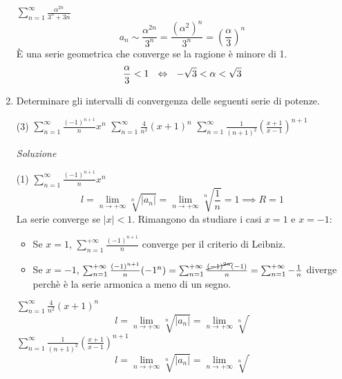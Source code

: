 \documentclass{article}
\begin{document}
\begin{enumerate}[label=\textbf{Esercizio 9.\arabic*.},itemindent=*]
\begin{tasks}
        \task $\sum_{n=1}^\infty\frac{\alpha^{2n}}{3^n+3n}$\\
        \[a_n\sim\frac{\alpha^{2n}}{3^n}=\frac{(\alpha^2)^n}{3^n}=\left( \frac{\alpha}{3} \right)^n\]
        È una serie geometrica che converge se la ragione è minore di 1. 
        \[\frac{\alpha}{3}<1 ~~\Leftrightarrow~~-\sqrt{3}<\alpha<\sqrt{3} \]
    \end{tasks}
    \item Determinare gli intervalli di convergenza delle seguenti serie di potenze.
    \begin{tasks}(3)
        \task $\sum_{n=1}^\infty\frac{(-1)^{n+1}}{n}x^n$
        \task $\sum_{n=1}^\infty\frac{4}{n^2}(x+1)^n$
        \task $\sum_{n=1}^\infty\frac{1}{(n+1)^2}\left( \frac{x+1}{x-1} \right)^{n+1}$
    \end{tasks}
    \item[\textit{\large Soluzione~}]~
    \begin{tasks}(1)
        \task $\sum_{n=1}^\infty\frac{(-1)^{n+1}}{n}x^n$
        \[l=\lim_{n\to+\infty}\sqrt[n]{|a_n|}=\lim_{n\to+\infty}\sqrt[n]{\frac{1}{n}}=1\implies R=1\]
        La serie converge se $|x|<1$. Rimangono da studiare i casi $x=1$ e $x=-1$:
        \begin{itemize}
            \item Se $x=1$, $\sum_{n=1}^{+\infty}\frac{(-1)^{n+1}}{n}$ converge per il criterio di Leibniz.
            \item Se $x=-1$, $\sum_{n=1}^{+\infty}\frac{(-1)^{n+1}}{n}(-1^n)=\sum_{n=1}^{+\infty}\frac{\cancel{(-1)^{2n}}(-1)}{n}=\sum_{n=1}^{+\infty}-\frac{1}{n}$ diverge perchè è la serie armonica a meno di un segno.
        \end{itemize}
        \task $\sum_{n=1}^\infty\frac{4}{n^2}(x+1)^n$
        \[l=\lim_{n\to+\infty}\sqrt[n]{|a_n|}=\lim_{n\to+\infty}\sqrt[n]{\frac{}{}}\]
        \task $\sum_{n=1}^\infty\frac{1}{(n+1)^2}\left( \frac{x+1}{x-1} \right)^{n+1}$
        \[l=\lim_{n\to+\infty}\sqrt[n]{|a_n|}=\lim_{n\to+\infty}\sqrt[n]{\frac{}{}}\]
    \end{tasks}

\end{enumerate}
\end{document}
